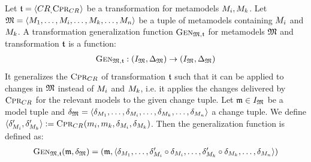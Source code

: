 \begin{definition}
    Let $\mathfrak{t} = \langle CR_{,} \textsc{Cpr}_{CR_{}} \rangle$ be a transformation for metamodels $M_{i}, M_{k}$.
    Let $\mathfrak{M} = \langle M_{1}, \dots, M_{i}, \dots, M_{k}, \dots, M_{n} \rangle$ be a tuple of metamodels containing $M_{i}$ and $M_{k}$.
    A transformation generalization function $\textsc{Gen}_{\mathfrak{M},\mathfrak{t}}$ for metamodels $\mathfrak{M}$ and transformation $\mathfrak{t}$ is a function:
    \begin{align*}
        \textsc{Gen}_{\mathfrak{M},\mathfrak{t}} : (I_{\mathfrak{M}}, \Delta_{\mathfrak{M}}) \rightarrow (I_{\mathfrak{M}}, \Delta_{\mathfrak{M}})
    \end{align*}
    It generalizes the \modellevelconsistencypreservationrule $\textsc{Cpr}_{CR_{}}$ of transformation $\mathfrak{t}$ such that it can be applied to changes in $\mathfrak{M}$ instead of $M_{i}$ and $M_{k}$, i.e. it applies the changes delivered by $\textsc{Cpr}_{CR_{}}$ for the relevant models to the given change tuple.
    Let $\mathfrak{m} \in I_{\mathfrak{M}}$ be a model tuple and $\mathfrak{\delta}_{\mathfrak{M}} = \langle \delta_{M_{1}}, \dots, \delta_{M_{i}}, \dots, \delta_{M_{k}}, \dots, \delta_{M_{n}} \rangle$ a change tuple.
    We define $\langle \delta_{M_{i}}', \delta_{M_{k}}' \rangle := \textsc{Cpr}_{CR_{}}(m_{i}, m_{k}, \delta_{M_{i}}, \delta_{M_{k}})$.
    Then the generalization function is defined as:
    \begin{align*}
        \textsc{Gen}_{\mathfrak{M},\mathfrak{t}}(\mathfrak{m}, \mathfrak{\delta}_{\mathfrak{M}}) =
        (\mathfrak{m}, \langle \delta_{M_{1}}, \dots, \delta_{M_{i}}' \circ \delta_{M_{i}}, \dots, \delta_{M_{k}}' \circ \delta_{M_{k}}, \dots, \delta_{M_{n}} \rangle)
    \end{align*}
\end{definition}

